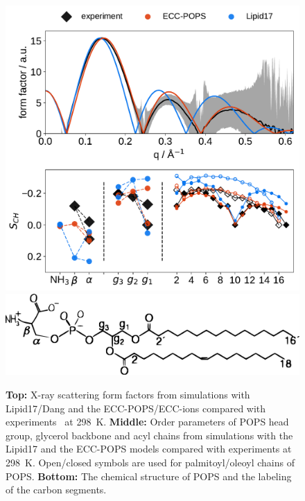\documentclass[journal=jpcbfk,manuscript=article]{achemso}
\newlength{\figwidth}
\begin{document}
\begin{figure}[tb!] 
  \centering 
  \includegraphics[width=\figwidth]{../img/ecc_pops/Order-parameters_form-factors_exp-L17-ECC-lipids.pdf}
  \includegraphics[width=\figwidth]{../img/POPSstructure.pdf} 
\hfill
  \caption{\label{simVSexpNOions_POPS} 
    \textbf{Top:} X-ray scattering form factors from simulations with Lipid17/Dang \citep{lipid17-future, dang2006} and 
    the ECC-POPS/ECC-ions \cite{martinek17, Pluhackova2016} compared with experiments~\citep{kucerka14} at 298~K. 
    \textbf{Middle:} Order parameters of POPS head group, glycerol backbone and acyl chains  
    from simulations with the Lipid17 \citep{lipid17-future} and the ECC-POPS models 
    compared with experiments at 298~K. \citep{NMRlipidsIV}
    Open/closed symbols are used for palmitoyl/oleoyl chains of POPS. 
    \textbf{Bottom:} The chemical structure of POPS and the labeling of the carbon segments. 
  }  
\end{figure} 
\end{document}

